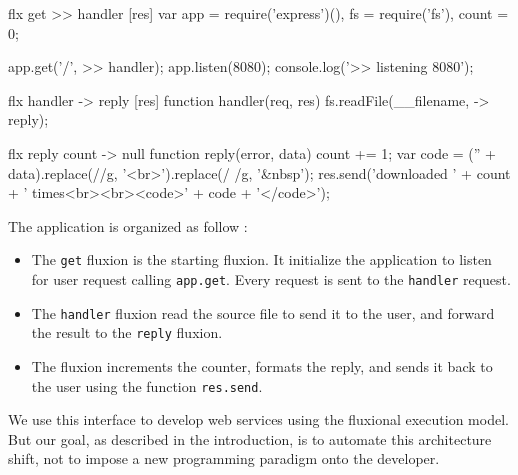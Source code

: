 





\begin{code}[flx, caption={Fluxional sample},label={lst:fluxional}]
flx get
>> handler [res]
  var app = require('express')(),
      fs = require('fs'),
      count = 0;

  app.get('/', >> handler);
  app.listen(8080);
  console.log('>> listening 8080');

flx handler
-> reply [res]
  function handler(req, res) {
    fs.readFile(__filename, -> reply);
  }

flx reply {count}
-> null
  function reply(error, data) {
    count += 1;
    var code = ('' + data).replace(/\n/g, '<br>').replace(/ /g, '&nbsp');
    res.send('downloaded ' + count + ' times<br><br><code>' + code + '</code>');
  }
\end{code}

The application is organized as follow :
\begin{itemize}
  \item The \texttt{get} fluxion is the starting fluxion.
  It initialize the application to listen for user request calling \texttt{app.get}.
  Every request is sent to the \texttt{handler} request.
  \item The \texttt{handler} fluxion read the source file to send it to the user, and forward the result to the \texttt{reply} fluxion.
  \item The  fluxion increments the counter, formats the reply, and sends it back to the user using the function \texttt{res.send}.
\end{itemize}

We use this interface to develop web services using the fluxional execution model.
But our goal, as described in the introduction, is to automate this architecture shift, not to impose a new programming paradigm onto the developer.


